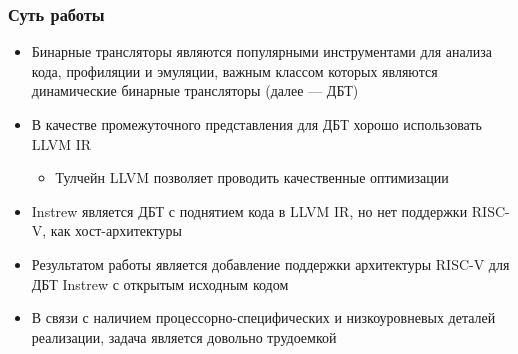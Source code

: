 \documentclass{vkr-slides-style}
\begin{document}
\makeslidestitle

\begin{frame}
    \frametitle{Суть работы}
    \begin{itemize}
        \item Бинарные трансляторы являются популярными инструментами для анализа кода, профиляции и эмуляции, важным классом которых являются динамические бинарные трансляторы (далее --- ДБТ)
        \item В качестве промежуточного представления для ДБТ хорошо использовать LLVM IR
              \begin{itemize}
                  \item Тулчейн LLVM позволяет проводить качественные оптимизации
              \end{itemize}
        \item Instrew является ДБТ с поднятием кода в LLVM IR, но нет поддержки RISC-V, как хост-архитектуры
        \item Результатом работы является добавление поддержки архитектуры RISC-V для ДБТ Instrew с открытым исходным кодом
        \item В связи с наличием процессорно-специфических и низкоуровневых деталей реализации, задача является довольно трудоемкой
    \end{itemize}
\end{frame}
\end{document}
